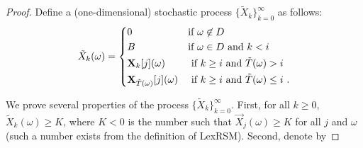 \begin{proof}
Define a 
(one-dimensional) stochastic process $\{\tilde{X}_k\}_{k=0}^{\infty}$ as 
follows:
$$
\tilde{X}_k(\omega) = \begin{dcases}
0 & \text{if $\omega \not\in D$}\\
B & \text{if $\omega \in D$ and $k<i$ }\\
\mathbf{X}_{k}[j](\omega) & \text{ if $k\geq i$ and $\tilde{T}(\omega)>i$ 
}\\
\mathbf{X}_{\tilde{T}(\omega)}[j](\omega) & \text{ if $k\geq i$ and 
$\tilde{T}(\omega)\leq i$ }.
\end{dcases}
$$

We prove several properties of the process $\{\tilde{X}_k\}_{k=0}^{\infty}$. 
First, for all $k\geq 0$, $\tilde{X}_k(\omega)\geq K$, where $K<0$ is the 
number 
such that $\vec{X}_j(\omega)\geq K$ for all $j$ and $\omega$ (such a number 
exists from the definition of LexRSM). Second, denote by 


	


% 
\end{proof}